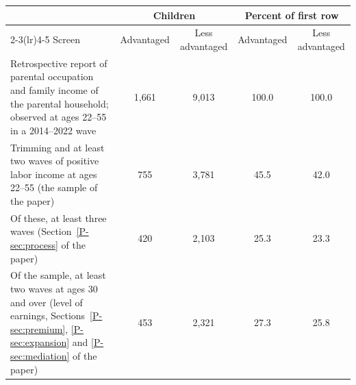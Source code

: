 \begin{tabular}{@{}p{6.0cm}cccc@{}}
\toprule
 & \multicolumn{2}{c}{Children} & \multicolumn{2}{c}{Percent of first row} \\
\cmidrule(lr){2-3}\cmidrule(lr){4-5}
Screen & Advantaged & Less advantaged & Advantaged & Less advantaged \\
\midrule
Retrospective report of parental occupation and family income of the parental household; observed at ages 22--55 in a 2014--2022 wave & 1,661 & 9,013 & 100.0 & 100.0 \\
Trimming and at least two waves of positive labor income at ages 22--55 (the sample of the paper) & 755 & 3,781 & 45.5 & 42.0 \\
Of these, at least three waves (Section~\ref{P-sec:process} of the paper) & 420 & 2,103 & 25.3 & 23.3 \\
Of the sample, at least two waves at ages 30 and over (level of earnings, Sections~\ref{P-sec:premium}, \ref{P-sec:expansion} and \ref{P-sec:mediation} of the paper) & 453 & 2,321 & 27.3 & 25.8 \\
\bottomrule
\end{tabular}

